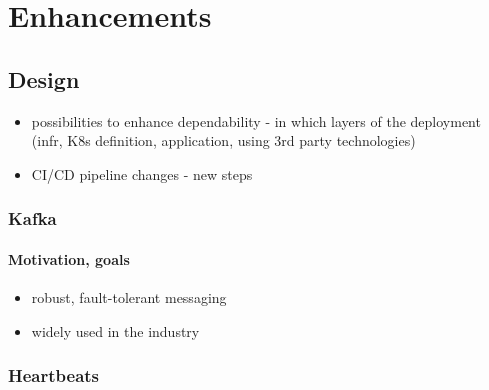 \chapter{Enhancements} \label{enhancements}

\section{Design}

\begin{itemize}
	\item possibilities to enhance dependability - in which layers of the deployment (infr, K8s definition, application, using 3rd party technologies)
	\item CI/CD pipeline changes -  new steps
\end{itemize}

\subsection{Kafka}

\subsubsection{Motivation, goals}

\begin{itemize}
	\item robust, fault-tolerant messaging
	\item widely used in the industry
\end{itemize}

\subsection{Heartbeats}

